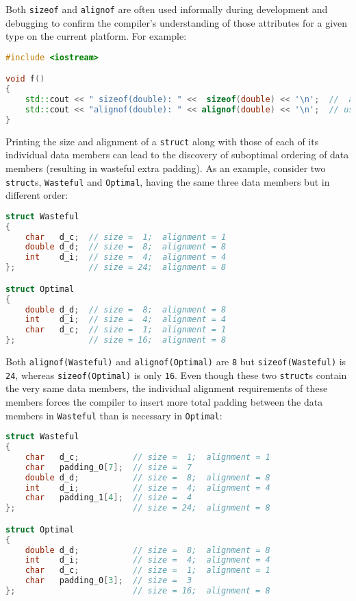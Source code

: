 Both \texttt{sizeof} and \texttt{alignof} are often used informally
during development and debugging to confirm the compiler's understanding
of those attributes for a given type on the current platform. For
example:

\begin{lstlisting}[language=C++]
#include <iostream>

void f()
{
    std::cout << " sizeof(double): " <<  sizeof(double) << '\n';  //  always 8
    std::cout << "alignof(double): " << alignof(double) << '\n';  // usually 8
}
\end{lstlisting}
    
\noindent Printing the size and alignment of a \texttt{struct} along with those of
each of its individual data members can lead to the discovery of
suboptimal ordering of data members (resulting in wasteful extra
padding). As an example, consider two \texttt{struct}s,
\texttt{Wasteful} and \texttt{Optimal}, having the same three data members but
in different order:

\begin{lstlisting}[language=C++]
struct Wasteful
{
    char   d_c;  // size =  1;  alignment = 1
    double d_d;  // size =  8;  alignment = 8
    int    d_i;  // size =  4;  alignment = 4
};               // size = 24;  alignment = 8

struct Optimal
{
    double d_d;  // size =  8;  alignment = 8
    int    d_i;  // size =  4;  alignment = 4
    char   d_c;  // size =  1;  alignment = 1
};               // size = 16;  alignment = 8
\end{lstlisting}
    
\noindent Both \texttt{alignof(Wasteful)} and \texttt{alignof(Optimal)} are
\texttt{8} but \texttt{sizeof(Wasteful)} is \texttt{24}, whereas
\texttt{sizeof(Optimal)} is only \texttt{16}. Even though these two
\texttt{struct}s contain the very same data members, the individual
alignment requirements of these members forces the compiler to insert
more total padding between the data members in \texttt{Wasteful} than is
necessary in \texttt{Optimal}:

\begin{lstlisting}[language=C++]
struct Wasteful
{
    char   d_c;           // size =  1;  alignment = 1
    char   padding_0[7];  // size =  7
    double d_d;           // size =  8;  alignment = 8
    int    d_i;           // size =  4;  alignment = 4
    char   padding_1[4];  // size =  4
};                        // size = 24;  alignment = 8

struct Optimal
{
    double d_d;           // size =  8;  alignment = 8
    int    d_i;           // size =  4;  alignment = 4
    char   d_c;           // size =  1;  alignment = 1
    char   padding_0[3];  // size =  3
};                        // size = 16;  alignment = 8
\end{lstlisting}
    

